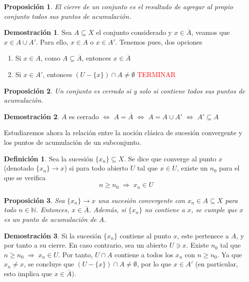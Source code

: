 \documentclass[12pt,twoside]{report}
\theoremstyle{azul}
\theoremstyle{azul2}
\theoremstyle{plain}
\newtheorem*{prop}{Proposición}
\theoremstyle{definition}
\newtheorem*{defi}{Definición}
\newtheorem*{dem}{Demostración}
\theoremstyle{remark}
\begin{document}
\begin{prop}
El cierre de un conjunto es el resultado de agregar al propio conjunto todos sus puntos de acumulación.
\end{prop}
\begin{dem}
Sea $A \subseteq X$ el conjunto considerado y $x \in \overline{A}$, veamos que $x \in A \cup A'$. Para ello, $x \in A$ o $x \in A'$. Tenemos pues, dos opciones
\begin{enumerate}
    \item Si $x \in A$, como $A \subseteq \overline{A}$, entonces $x \in \overline{A}$
    \item Si $x \in A'$, entonces $(U-\{x\}) \cap A \neq \emptyset$ \textcolor{red}{TERMINAR}
\end{enumerate}

\end{dem}

\begin{prop}
Un conjunto es cerrado si y solo si contiene todos sus puntos de acumulación. 
\end{prop}
\begin{dem}
$A$ es cerrado $\iff$ $A=\overline{A} $ $\iff$ $A=A \cup A'$ $\iff$ $A' \subseteq A$ 
\end{dem}

Estudiaremos ahora la relación entre la noción clásica de sucesión convergente y los puntos de acumulación de un subconjunto.

\begin{defi}
Sea la sucesión $\{x_n\} \subseteq X$. Se dice que converge al punto $x$ (denotado $\{x_n\} \to x$) si para todo abierto $U$ tal que $x \in U$, existe un $n_0$ para el que se verifica $$n\geq n_0 \;\Rightarrow \; x_n \in U$$
\end{defi}

\begin{prop}
Sea $\{x_n\} \to x$ una sucesión convergente con $x_n \in A \subseteq X$ para todo $n \in \mathbb{N}$. Entonces, $x \in \overline{A}$. Además, si $\{x_n\}$ no contiene a $x$, se cumple que $x$ es un punto de acumulación de $A$.
\end{prop} 
\begin{dem}
Si la sucesión $\{x_n\}$ contiene al punto $x$, este pertenece a $A$, y por tanto a su cierre. En caso contrario, sea un abierto $U \ni x$. Existe $n_0$ tal que $n\geq n_0 \;\Rightarrow \; x_n \in U$. Por tanto, $U \cap A$ contiene a todos los $x_n$ con $n \geq n_0$. Ya que $x_n \neq x$, se concluye que $(U-\{x\}) \cap A \neq \emptyset$, por lo que $x \in A'$ (en particular, esto implica que $x \in \overline{A})$.
\end{dem} 
\end{document}
